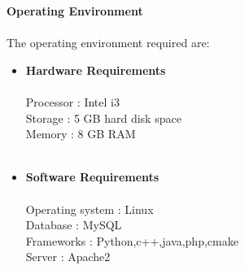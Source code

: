 \textbf{Operating Environment}
\\ \\
The operating environment required are: \\
\begin{itemize}
\\
\item\textbf{ Hardware Requirements} \\ \\
Processor			:	Intel i3\\
Storage				: 	5 GB hard disk space\\
Memory				: 	8 GB RAM\\ 
\\
\item\textbf{Software Requirements} \\ \\
Operating system	: 	Linux\\
Database			: 	MySQL\\
Frameworks			: 	Python,c++,java,php,cmake\\
Server				: 	Apache2\\ \\ \\
\end{itemize}

